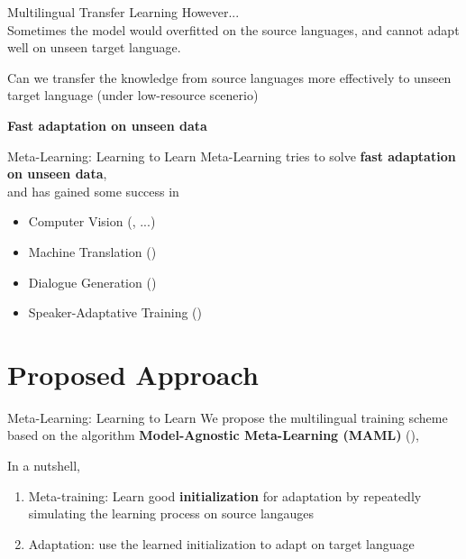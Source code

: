 \documentclass{beamer}
\begin{document}
\begin{frame}[t]{Multilingual Transfer Learning}
  However...\\
  Sometimes the model would overfitted on the source languages, and cannot adapt well on unseen target language.

  \vspace{1em}
  \pause
  Can we transfer the knowledge from source languages more effectively to unseen target language (under low-resource scenerio)

  \vspace{1em}

  \pause

  \center \textbf{Fast adaptation on unseen data}
\end{frame}

\begin{frame}[t]{Meta-Learning: Learning to Learn}
  Meta-Learning tries to solve \textbf{fast adaptation on unseen data}, \\
  and has gained some success in
  \begin{itemize}
    \item Computer Vision (\citealt{snell2017prototypical}, \citealt{rusu2018meta} ...)
    \item Machine Translation (\citealt{gu2018meta})
    \item Dialogue Generation (\citealt{mi2019meta})
    \item Speaker-Adaptative Training (\citealt{klejch2019speaker})
  \end{itemize}
\end{frame}


\section{Proposed Approach}
\begin{frame}[t]{Meta-Learning: Learning to Learn}
  We propose the multilingual training scheme based on the algorithm \textbf{Model-Agnostic Meta-Learning (MAML)} (\citealt{finn2017model}),

  \vspace{3em}

  In a nutshell,
  \begin{enumerate}
    \item Meta-training: Learn good \textbf{initialization} for adaptation by repeatedly simulating the learning process on source langauges
    \item Adaptation: use the learned initialization to adapt on target language
  \end{enumerate}
\end{frame}
\end{document}

